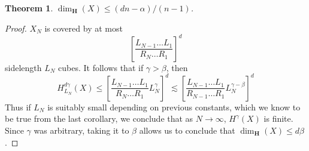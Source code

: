 \documentclass{article}
\theoremstyle{plain}
\theoremstyle{plain}
\newtheorem{theorem}{Theorem}
\begin{document}
\begin{multicols}{2}
\begin{theorem}
	$\dim_{\mathbf{H}}(X) \leq (dn - \alpha)/(n-1)$.
\end{theorem}
\begin{proof}
	$X_N$ is covered by at most
	\[ \left[ \frac{L_{N-1} \dots L_1}{R_N \dots R_1} \right]^d \]
	sidelength $L_N$ cubes. It follows that if $\gamma > \beta$, then
	\[ H^{d\gamma}_{L_N}(X) \leq \left[ \frac{L_{N-1} \dots L_1}{R_N \dots R_1} L_N^\gamma \right]^d \lesssim \left[ \frac{L_{N-1} \dots L_1}{R_{N-1} \dots R_1} L_N^{\gamma - \beta} \right]^d \]
	Thus if $L_N$ is suitably small depending on previous constants, which we know to be true from the last corollary, we conclude that as $N \to \infty$, $H^\gamma(X)$ is finite. Since $\gamma$ was arbitrary, taking it to $\beta$ allows us to conclude that $\dim_{\mathbf{H}}(X) \leq d \beta$.
\end{proof}




\end{multicols}
\end{document}
